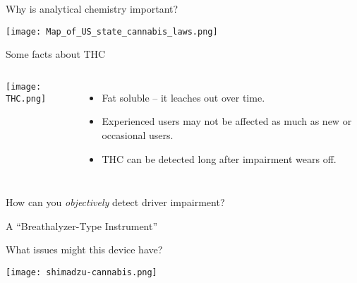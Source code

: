 \documentclass[notes=show]{beamer}
\begin{document}
\begin{frame}{Why is analytical chemistry important?}
	\begin{center}
		\texttt{[image: Map\_of\_US\_state\_cannabis\_laws.png]}
	\end{center}
\end{frame}

\begin{frame}{Some facts about THC}
	\begin{columns}
	\begin{center}
		\texttt{[image: THC.png]}
	\end{center}

	\begin{itemize}
		\item Fat soluble -- it leaches out over time.
		\item Experienced users may not be affected as much as new or
			occasional users.
		\item THC can be detected long after impairment wears off.
	\end{itemize}
	\end{columns}

	\pause

	\begin{center}
		How can you \emph{objectively} detect driver impairment?
	\end{center}

\end{frame}

\begin{frame}{A ``Breathalyzer-Type Instrument''}
	\centering


	\pause
	

	\pause

	What issues might this device have?

\end{frame}

\begin{frame}
	\texttt{[image: shimadzu-cannabis.png]}

\end{frame}
\end{document}
